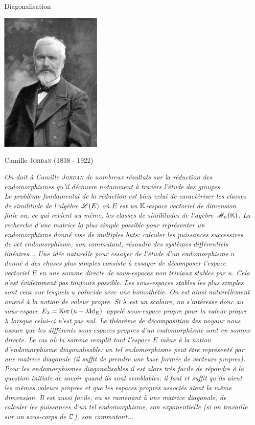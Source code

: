 {\Large Diagonalisation} \\
\begin{marginfigure}[1cm]
    \centering
    \includegraphics[width=5cm]{images/camille_jordan.jpg}
    \caption*{\centering Camille \textsc{Jordan} (1838 - 1922)}
\end{marginfigure}
\textsl{On doit à Camille \textsc{Jordan} de nombreux résultats sur la réduction des endomorphismes qu'il découvre notamment à travers l'étude des groupes. \\
Le problème fondamental de la réduction est bien celui de caractériser les classes de similitude de l'algèbre $\mathscr{L}(E)$ où $E$ est un $\mathbb{K}$-espace vectoriel de dimension finie ou, ce qui revient au même, les classes de similitudes de l'agèbre $\mathscr{M}_n(\mathbb{K})$. La recherche d'une matrice la plus simple possible pour représenter un endomorphisme donné vise de multiples buts: calculer les puissances successives de cet endomorphisme, son commutant, résoudre des systèmes différentiels linéaires... Une idée naturelle pour essayer de  l'étude d'un endomorphisme $u$ donné à des choses plus simples consiste à essayer de décomposer l'espace vectoriel $E$ en une somme directe de sous-espaces non triviaux stables par $u$. Cela n'est évidemment pas toujours possible. Les sous-espaces stables les plus simples sont ceux sur lesquels $u$ coïncide avec une homothétie. On est ainsi naturellement amené à la notion de valeur propre. Si $\lambda$ est un scalaire, on s'intéresse donc au sous-espace $E_\lambda = \mathrm{Ker}\,(u - \lambda \mathrm{Id}_E)$ appelé sous-espace propre pour la valeur propre $\lambda$ lorsque celui-ci n'est pas nul. Le théorème de décomposition des noyaux nous assure que les différents sous-espaces propres d'un endomorphisme sont en somme directe. Le cas où la somme remplit tout l'espace $E$ mène à la notion d'endomorphisme diagonalisable: un tel endomorphisme peut être représenté par une matrice diagonale (il suffit de prendre une base formée de vecteurs propres). Pour les endomorphismes diagonalisables il est alors très facile de répondre à la question initiale de savoir quand ils sont semblables: il faut et suffit qu'ils aient les mêmes valeurs propres et que les espaces propres associés aient la même dimension. Il est aussi facile, en se ramenant à une matrice diagonale, de calculer les puissances d'un tel endomorphisme, son exponentielle (si on travaille sur un sous-corps de $\mathbb{C}$), son commutant...}
